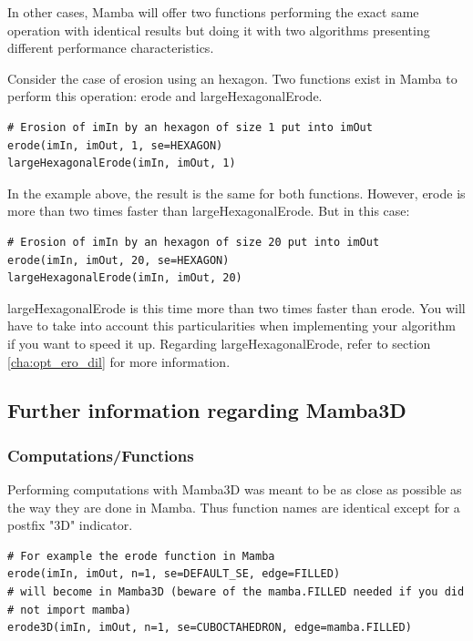 \documentclass[a4paper,10pt,oneside]{article}
\begin{document}
In other cases, Mamba will offer two functions performing the exact same 
operation with identical results but doing it with two algorithms presenting
different performance characteristics.

Consider the case of erosion using an hexagon. Two functions exist in Mamba to
perform this operation: erode and largeHexagonalErode.

\lstset{language=Python}
\begin{lstlisting}
# Erosion of imIn by an hexagon of size 1 put into imOut
erode(imIn, imOut, 1, se=HEXAGON)
largeHexagonalErode(imIn, imOut, 1)
\end{lstlisting}

In the example above, the result is the same for both functions. However, erode is
more than two times faster than largeHexagonalErode. But in this case:

\lstset{language=Python}
\begin{lstlisting}
# Erosion of imIn by an hexagon of size 20 put into imOut
erode(imIn, imOut, 20, se=HEXAGON)
largeHexagonalErode(imIn, imOut, 20)
\end{lstlisting}

largeHexagonalErode is this time more than two times faster than erode. You will
have to take into account this particularities when implementing your algorithm
if you want to speed it up. Regarding largeHexagonalErode, refer to section 
\ref{cha:opt_ero_dil} for more information.

\pagebreak

\subsection{Further information regarding Mamba3D}

\subsubsection{Computations/Functions}

Performing computations with Mamba3D was meant to be as close as possible
as the way they are done in Mamba. Thus function names are identical except
for a postfix "3D" indicator.

\lstset{language=Python}
\begin{lstlisting}
# For example the erode function in Mamba
erode(imIn, imOut, n=1, se=DEFAULT_SE, edge=FILLED)
# will become in Mamba3D (beware of the mamba.FILLED needed if you did 
# not import mamba)
erode3D(imIn, imOut, n=1, se=CUBOCTAHEDRON, edge=mamba.FILLED)
\end{lstlisting}
\end{document}
